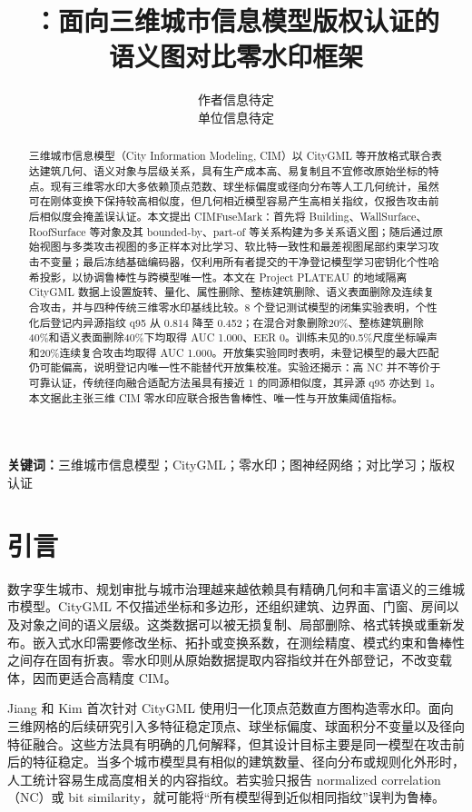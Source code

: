 \documentclass[UTF8,fontset=fandol,12pt]{ctexart}
\title{\method：面向三维城市信息模型版权认证的\\语义图对比零水印框架}
\author{作者信息待定\\单位信息待定}
\date{}
\newcommand{\method}{CIMFuseMark}
\begin{document}
\maketitle

\begin{abstract}
三维城市信息模型（City Information Modeling, CIM）以 CityGML 等开放格式联合表达建筑几何、语义对象与层级关系，具有生产成本高、易复制且不宜修改原始坐标的特点。现有三维零水印大多依赖顶点范数、球坐标偏度或径向分布等人工几何统计，虽然可在刚体变换下保持较高相似度，但几何相近模型容易产生高相关指纹，仅报告攻击前后相似度会掩盖误认证。本文提出 \method：首先将 Building、WallSurface、RoofSurface 等对象及其 bounded-by、part-of 等关系构建为多关系语义图；随后通过原始视图与多类攻击视图的多正样本对比学习、软比特一致性和最差视图尾部约束学习攻击不变量；最后冻结基础编码器，仅利用所有者提交的干净登记模型学习密钥化个性哈希投影，以协调鲁棒性与跨模型唯一性。本文在 Project PLATEAU 的地域隔离 CityGML 数据上设置旋转、量化、属性删除、整栋建筑删除、语义表面删除及连续复合攻击，并与四种传统三维零水印基线比较。8 个登记测试模型的闭集实验表明，个性化后登记内异源指纹 q95 从 0.814 降至 0.452；在混合对象删除20\%、整栋建筑删除40\%和语义表面删除40\%下均取得 AUC 1.000、EER 0。训练未见的0.5\%尺度坐标噪声和20\%连续复合攻击均取得 AUC 1.000。开放集实验同时表明，未登记模型的最大匹配仍可能偏高，说明登记内唯一性不能替代开放集校准。实验还揭示：高 NC 并不等价于可靠认证，传统径向融合适配方法虽具有接近 1 的同源相似度，其异源 q95 亦达到 1。本文据此主张三维 CIM 零水印应联合报告鲁棒性、唯一性与开放集阈值指标。
\end{abstract}

\noindent\textbf{关键词：}三维城市信息模型；CityGML；零水印；图神经网络；对比学习；版权认证

\section{引言}
数字孪生城市、规划审批与城市治理越来越依赖具有精确几何和丰富语义的三维城市模型。CityGML 不仅描述坐标和多边形，还组织建筑、边界面、门窗、房间以及对象之间的语义层级\cite{OGCCityGML3}。这类数据可以被无损复制、局部删除、格式转换或重新发布。嵌入式水印需要修改坐标、拓扑或变换系数，在测绘精度、模式约束和鲁棒性之间存在固有折衷\cite{WangSurvey2008}。零水印则从原始数据提取内容指纹并在外部登记，不改变载体，因而更适合高精度 CIM。

Jiang 和 Kim 首次针对 CityGML 使用归一化顶点范数直方图构造零水印\cite{Jiang2018}。面向三维网格的后续研究引入多特征稳定顶点\cite{Wang2019}、球坐标偏度\cite{Lee2021}、球面积分不变量以及径向特征融合\cite{Hu2026}。这些方法具有明确的几何解释，但其设计目标主要是同一模型在攻击前后的特征稳定。当多个城市模型具有相似的建筑数量、径向分布或规则化外形时，人工统计容易生成高度相关的内容指纹。若实验只报告 normalized correlation（NC）或 bit similarity，就可能将“所有模型得到近似相同指纹”误判为鲁棒。
\end{document}
